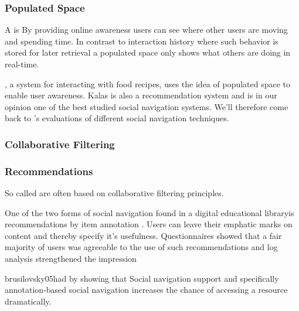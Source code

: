 
\subsubsection{Populated Space}

A  is
By providing online awareness users can see where other users are moving and
spending time. In contrast to interaction history where such behavior is
stored for later retrieval a populated space only shows what others are doing
in real-time.

 \citep{svensson05}, a system for interacting with food
recipes, uses the idea of populated space to enable user awareness. Kalas is
also a recommendation system and is in our opinion one of the best studied
social navigation systems. We'll therefore come back to
\citeauthor{svensson05}'s evaluations of different social
navigation techniques.

\subsubsection{Collaborative Filtering}
\label{section:background.social.navigation.applied.forms.collaborative.filtering}


\subsubsection{Recommendations}
\label{section:background.social.navigation.applied.forms.recommendations}

So called  are often based on collaborative
filtering principles. %

One of the two forms of social navigation found in
\dash{}a digital educational
library\dash{}is recommendations by item
annotation \citep[p.~13]{brusilovsky05}. Users can leave their emphatic marks
on content and thereby specify it's usefulness. Questionnaires showed that a
fair majority of users was agreeable to the use of such recommendations
\citeyearpar[p.~15]{brusilovsky05} and log analysis strengthened
the impression
\begin{fullquote}[p.~38]{brusilovsky05}{had by showing that}
  Social navigation support and specifically
  annotation-based social navigation increases the chance of
  accessing a resource dramatically.
\end{fullquote}

